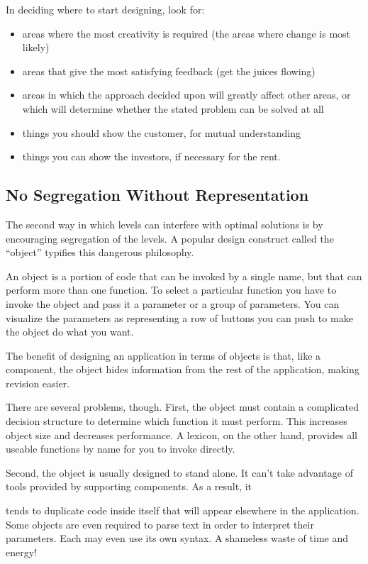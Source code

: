 \begin{tip}
In deciding where to start designing, look for:

\begin{itemize}
	\item areas where the most creativity is required (the areas where change is most likely)
	\item areas that give the most satisfying feedback (get the juices flowing)
	\item areas in which the approach decided upon will greatly affect other areas, or which will determine whether the stated problem can be solved at all
	\item things you should show the customer, for mutual understanding
	\item things you can show the investors, if necessary for the rent.
\end{itemize}
\end{tip}

\subsection{No Segregation Without Representation}
The second way in which levels can interfere with optimal solutions is by
encouraging segregation of the levels. A popular design construct called
the ``object'' typifies this dangerous philosophy.

An object is a portion of code that can be invoked by a single name,
but that can perform more than one function. To select a particular
function you have to invoke the object and pass it a parameter or a
group of parameters. You can visualize the parameters as representing
a row of buttons you can push to make the object do what you want.

The benefit of designing an application in terms of objects is that,
like a component, the object hides information from the rest of the
application, making revision easier.

There are several problems, though. First, the object must contain a
complicated decision structure to determine which function it must
perform. This increases object size and decreases performance. A
lexicon, on the other hand, provides all useable functions by name for
you to invoke directly.

Second, the object is usually designed to stand alone. It can't take
advantage of tools provided by supporting components. As a result, it

tends to duplicate code inside itself that will appear elsewhere in
the application. Some objects are even required to parse text in order
to interpret their parameters. Each may even use its own syntax. A
shameless waste of time and energy!

